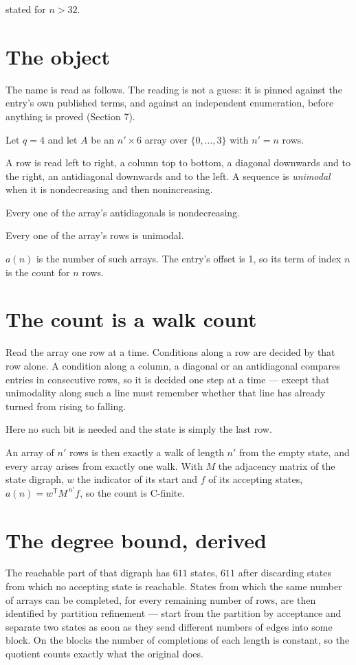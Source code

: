 \documentclass[11pt]{article}
\theoremstyle{definition}
\begin{document}
stated for $n > 32$.

\section{The object}

The name is read as follows. The reading is not a guess: it is pinned against the entry's own published terms, and against an independent enumeration, before anything is proved (Section 7).

Let $q = 4$ and let $A$ be an $n' \times 6$ array over $\{0,\dots,3\}$ with $n' = n$ rows.

A row is read left to right, a column top to bottom, a diagonal downwards and to the right, an antidiagonal downwards and to the left. A sequence is {\itshape unimodal} when it is nondecreasing and then nonincreasing.

Every one of the array's antidiagonals is nondecreasing.

Every one of the array's rows is unimodal.

$a(n)$ is the number of such arrays. The entry's offset is 1, so its term of index $n$ is the count for $n$ rows.

\section{The count is a walk count}

Read the array one row at a time. Conditions along a row are decided by that row alone. A condition along a column, a diagonal or an antidiagonal compares entries in consecutive rows, so it is decided one step at a time --- except that unimodality along such a line must remember whether that line has already turned from rising to falling.

Here no such bit is needed and the state is simply the last row.

An array of $n'$ rows is then exactly a walk of length $n'$ from the empty state, and every array arises from exactly one walk. With $M$ the adjacency matrix of the state digraph, $w$ the indicator of its start and $f$ of its accepting states, $a(n) = w^{\mathsf T}M^{\,n'}f$, so the count is C-finite.

\section{The degree bound, derived}

The reachable part of that digraph has $611$ states, $611$ after discarding states from which no accepting state is reachable. States from which the same number of arrays can be completed, for every remaining number of rows, are then identified by partition refinement --- start from the partition by acceptance and separate two states as soon as they send different numbers of edges into some block. On the blocks the number of completions of each length is constant, so the quotient counts exactly what the original does.
\end{document}
